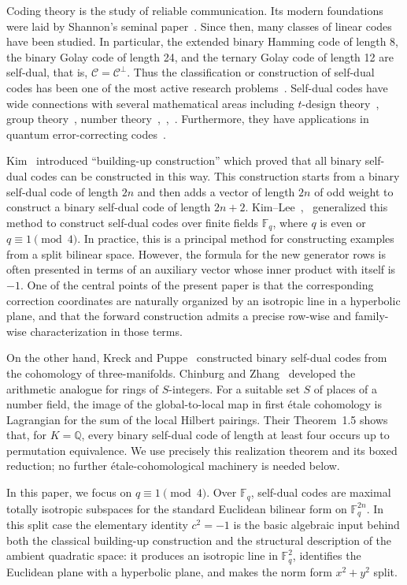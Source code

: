 \documentclass[12pt]{article}
\newcommand{\F}{\mathbb{F}}
\begin{document}
Coding theory is the study of reliable communication. Its modern foundations
were laid by Shannon's seminal paper~\cite{Sha}. Since then, many classes of
linear codes have been studied. In particular, the extended binary Hamming
code of length 8, the binary Golay code of length 24, and the ternary Golay
code of length 12 are self-dual, that is,
$\mathcal C=\mathcal C^{\perp}$.
Thus the classification or construction of self-dual codes has been one of the most active research problems~\cite{self-dual}.
Self-dual codes have wide connections with several mathematical areas including $t$-design theory~\cite{BacGab}, group theory~\cite{ConSlo}, number theory~\cite{BaDou},~\cite{ConSlo},~\cite{ShiChoShaSol}. Furthermore, they have applications in quantum error-correcting codes~\cite{CRSS}.

Kim~\cite{Kim2001} introduced ``building-up construction'' which proved that all binary self-dual codes can be constructed in this way. This construction starts from a binary self-dual code of length $2n$ and then adds a vector of length $2n$ of odd weight to construct a binary self-dual code of length $2n+2$. Kim--Lee~\cite{KimLee2009},~\cite{KimLee} generalized this method to construct self-dual codes over finite fields $\mathbb F_q$, where $q$ is even or $q \equiv 1 \pmod{4}$.
 In practice, this is a principal method for constructing examples from a
 split bilinear space. However, the formula for the new generator rows is
 often presented in terms of an auxiliary vector whose inner product with
 itself is $-1$. One of the central points of the present paper is that the
 corresponding correction coordinates are naturally organized by an
 isotropic line in a hyperbolic plane, and that the forward construction
 admits a precise row-wise and family-wise characterization in those terms.

 On the other hand, Kreck and Puppe~\cite{KreckPuppe} constructed binary
self-dual codes from the cohomology of three-manifolds. Chinburg and
Zhang~\cite{ChinburgZhang} developed the arithmetic analogue for rings of
$S$-integers. For a suitable set $S$ of places of a number field, the image
of the global-to-local map in first \'{e}tale cohomology is Lagrangian for
the sum of the local Hilbert pairings. Their Theorem~1.5 shows that, for
$K=\mathbb Q$, every binary self-dual code of length at least four occurs up
to permutation equivalence. We use precisely this realization theorem and
its boxed reduction; no further \'{e}tale-cohomological machinery is needed
below.

In this paper, we focus on $q \equiv 1 \pmod 4$. Over $\F_q$, self-dual codes are maximal totally isotropic subspaces for the standard Euclidean bilinear form on $\F_q^{2n}$. In this split case the elementary identity $c^2=-1$ is the basic algebraic input behind both the classical building-up construction and the structural description of the ambient quadratic space: it produces an isotropic line in $\F_q^2$, identifies the Euclidean plane with a hyperbolic plane, and makes the norm form $x^2+y^2$ split.
\end{document}
